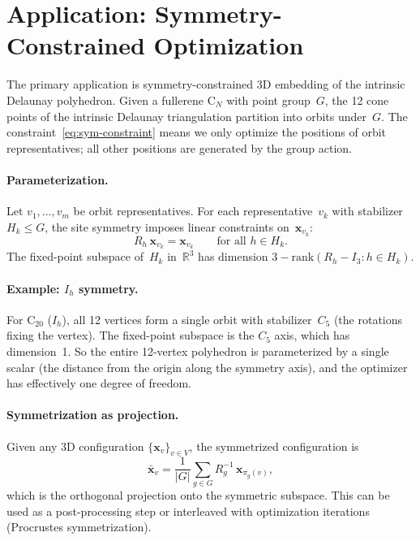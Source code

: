 \documentclass[11pt]{article}
\newcommand{\R}{\mathbb{R}}
\begin{document}
\section{Application: Symmetry-Constrained Optimization}
\label{sec:application}

The primary application is symmetry-constrained 3D embedding of the
intrinsic Delaunay polyhedron.  Given a fullerene C$_N$ with point
group~$G$, the 12 cone points of the intrinsic Delaunay triangulation
partition into orbits under~$G$.  The
constraint~\eqref{eq:sym-constraint} means we only optimize the
positions of orbit representatives; all other positions are generated by
the group action.

\paragraph{Parameterization.}
Let $v_1, \ldots, v_m$ be orbit representatives.  For each representative~$v_k$
with stabilizer~$H_k \leq G$, the site symmetry imposes linear constraints
on~$\mathbf{x}_{v_k}$:
\begin{equation}
  R_h \, \mathbf{x}_{v_k} = \mathbf{x}_{v_k}
  \qquad \text{for all } h \in H_k.
\end{equation}
The fixed-point subspace of~$H_k$ in~$\R^3$ has dimension
$3 - \mathrm{rank}(R_h - I_3 : h \in H_k)$.

\paragraph{Example: $I_h$ symmetry.}
For C$_{20}$ ($I_h$), all 12 vertices form a single orbit with
stabilizer~$C_5$ (the rotations fixing the vertex).  The fixed-point
subspace is the $C_5$ axis, which has dimension~1.  So the entire
12-vertex polyhedron is parameterized by a single scalar (the distance
from the origin along the symmetry axis), and the optimizer has
effectively one degree of freedom.

\paragraph{Symmetrization as projection.}
Given any 3D configuration $\{\mathbf{x}_v\}_{v \in V}$, the
symmetrized configuration is
\begin{equation}
  \bar{\mathbf{x}}_v = \frac{1}{|G|} \sum_{g \in G}
    R_g^{-1} \, \mathbf{x}_{\pi_g(v)},
\end{equation}
which is the orthogonal projection onto the symmetric subspace.  This
can be used as a post-processing step or interleaved with optimization
iterations (Procrustes symmetrization).
\end{document}
